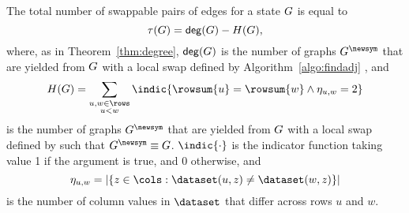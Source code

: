 \begin{theorem}\label{thm:graphadjnum}
  The total number of swappable pairs of edges for a state $G$ is equal to
  \begin{equation}\label{eq:graphadjnum}
    \tau(G) = \mathsf{deg}(G) - H(G),
  \end{equation}
  where, as in Theorem~\ref{thm:degree}, $\mathsf{deg}(G)$ is the number of
  graphs $\graphadj$ that are yielded from $G$ with a local swap defined
  by Algorithm~\ref{algo:findadj} \textnormal{\findadj{}}, and
  \begin{equation}\label{eq:eqgraphadjnum}
    \eqgraphsnum{\graph} = \sum_{\substack{u, w \in \rows \\ u < w}}
    \indic{\rowsum{u} = \rowsum{w} \wedge \colsneqnum{u}{w} = 2}
  \end{equation}
  is the number of graphs $\graphadj$ that are yielded from $G$ with a
  local swap defined by \textnormal{\findadj{}} such that $\graphadj \equiv
  \graph$. $\indic{\cdot}$ is the indicator function taking value 1 if the
  argument is true, and 0 otherwise, and
  \[
    \colsneqnum{u}{w} = |\{z \in \cols : \dataset(u, z) \neq \dataset(w, z)\}|
  \]
  is the number of column values in $\dataset$ that differ across rows $u$ and
  $w$.
\end{theorem}

